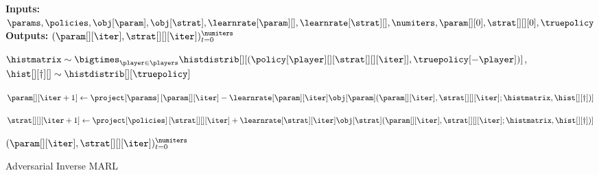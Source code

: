 
\begin{wrapfigure}{L}{0.6125\textwidth}
    \vspace*{-0.8cm}
    \begin{minipage}{0.6125\textwidth}
    \begin{algorithm}[H]
    \caption{Adversarial Inverse MARL} 
    \textbf{Inputs:} $\params, \policies, \obj[\param], \obj[\strat], \learnrate[\param][ ], \learnrate[\strat][ ], \numiters, \param[][0], \strat[][][0], \truepolicy$ \\
    \textbf{Outputs:} $(\param[][\iter], \strat[][][\iter])_{t = 0}^\numiters$
    \label{alg:online-sgda}
    \begin{algorithmic}[1]
            
            \State 
            $\histmatrix \sim \bigtimes_{\player \in \players} \histdistrib[][{(\policy[\player][][{\strat[][][\iter]}], \truepolicy[-\player])}]$, $\hist[][\dagger][] \sim \histdistrib[][\truepolicy]$
            
            \State $\param[][\iter + 1] \gets \project[\params] \left[\param[][\iter] - \learnrate[\param][\iter] \obj[\param] (\param[][\iter], \strat[][][\iter]; \histmatrix, \hist[][\dagger]) \right]$
        
            \State $\strat[][][\iter + 1] \gets \project[\policies] \left[ \strat[][][\iter] + \learnrate[\strat][\iter] \obj[\strat] (\param[][\iter], \strat[][][\iter]; \histmatrix, \hist[][\dagger]) \right]$
    
            
    \EndFor
    \State \Return $(\param[][\iter], \strat[][][\iter])_{t = 0}^\numiters$
    \end{algorithmic}
    \end{algorithm}
    \end{minipage}
    \vspace*{-0.4cm}
\end{wrapfigure}
